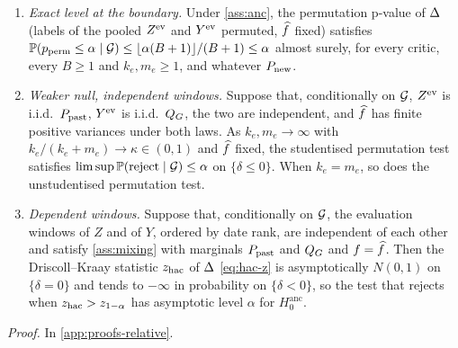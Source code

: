 \begin{proposition}\label{prop:anchored}
\begin{enumerate}
  \item[(a)] \emph{Exact level at the boundary.} Under \cref{ass:anc}, the permutation p-value of
  $\Delta$ (labels of the pooled $Z^{\mathrm{ev}}$ and $Y^{\mathrm{ev}}$ permuted, $\widehat{f}$ fixed) satisfies
  $\mathbb{P}(p_{\mathrm{perm}}\le\alpha\mid\mathcal{G})\le\lfloor\alpha(B+1)\rfloor/(B+1)\le\alpha$ almost surely, for
  every critic, every $B\ge1$ and $k_e,m_e\ge1$, and whatever $P_{\mathrm{new}}$.
  \item[(b)] \emph{Weaker null, independent windows.} Suppose that, conditionally on $\mathcal{G}$,
  $Z^{\mathrm{ev}}$ is i.i.d.\ $P_{\mathrm{past}}$, $Y^{\mathrm{ev}}$ is i.i.d.\ $Q_{G}$, the two are independent, and
  $\widehat{f}$ has finite positive variances under both laws. As $k_e,m_e\to\infty$ with
  $k_e/(k_e+m_e)\to\kappa\in(0,1)$ and $\widehat{f}$ fixed, the studentised permutation test satisfies
  $\limsup\mathbb{P}(\text{reject}\mid\mathcal{G})\le\alpha$ on $\{\delta\le0\}$. When $k_e=m_e$, so does the
  unstudentised permutation test.
  \item[(c)] \emph{Dependent windows.} Suppose that, conditionally on $\mathcal{G}$, the evaluation
  windows of $Z$ and of $Y$, ordered by date rank, are independent of each other and satisfy
  \cref{ass:mixing} with marginals $P_{\mathrm{past}}$ and $Q_{G}$ and $f=\widehat{f}$. Then the Driscoll--Kraay
  statistic $z_{\mathrm{hac}}$ of $\Delta$ \eqref{eq:hac-z} is asymptotically $N(0,1)$ on $\{\delta=0\}$ and
  tends to $-\infty$ in probability on $\{\delta<0\}$, so the test that rejects when
  $z_{\mathrm{hac}}>z_{1-\alpha}$ has asymptotic level $\alpha$ for $H_0^{\mathrm{anc}}$.
\end{enumerate}
\end{proposition}
\noindent\textit{Proof.} In \cref{app:proofs-relative}.

